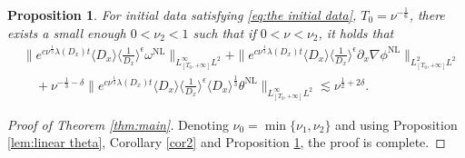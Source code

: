 \documentclass[reqno, 12pt]{amsart} %
\theoremstyle{plain} %
\newtheorem{Prop}[Thm]{Proposition}
\theoremstyle{definition}
\theoremstyle{remark}
\numberwithin{equation}{section} %
\begin{document}
	
	
	\begin{Prop} \label{prop2.3}
		For initial data satisfying \eqref{eq:the initial data}, $T_0 = \nu^{-\frac16}$, there exists a small enough $0< \nu_2<1$ such that if $0<\nu<\nu_2$, it holds that
		\begin{equation*}
			\begin{aligned}
				&\| e^{c \nu^{\frac{1}{3}} \lambda(D_x) t} \langle D_x \rangle \langle \tfrac{1}{D_x} \rangle^\epsilon \omega^{\mathrm{NL}} \|_{L^\infty_{[T_0, +\infty]} L^2}  + \|e^{c \nu^{\frac{1}{3}} \lambda\left(D_x\right) t}\langle D_x\rangle\langle\frac{1}{D_x}\rangle^\epsilon \partial_x \nabla \phi^{\mathrm{NL}}\|_{L_{[T_0, +\infty]}^2 L^2} \\
				&\quad + \nu^{-\frac{1}{3} - \delta} \| e^{c \nu^{\frac{1}{3}} \lambda(D_x) t} \langle D_x \rangle \langle \tfrac{1}{D_x} \rangle^\epsilon \langle D_x \rangle^{\frac{1}{3}} \theta^{\mathrm{NL}} \|_{L^\infty_{[T_0, +\infty]} L^2} 
				\lesssim \nu^{\frac{1}{2} + 2\delta}.
			\end{aligned}
		\end{equation*}
	\end{Prop}
	
	\begin{proof}[Proof of Theorem \ref{thm:main}]
		Denoting $\nu_0= \min\{\nu_1, \nu_2\}$ and using  Proposition \ref{lem:linear theta}, Corollary \ref{cor2} and Proposition \ref{prop2.3},  the proof is complete.
	\end{proof}
	
	
	
\end{document}

